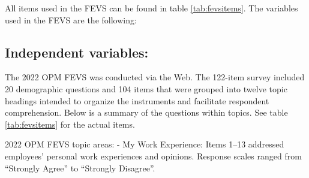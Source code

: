 \documentclass[
  man]{apa7}
\begin{document}
All items used in the FEVS can be found in table \ref{tab:fevsitems}. The variables used in the FEVS are the following:

\subsection{Independent variables:}\label{independent-variables}

The 2022 OPM FEVS was conducted via the Web. The 122-item survey included 20 demographic questions and 104 items that were grouped into twelve topic headings intended to organize the instruments and facilitate respondent comprehension. Below is a summary of the questions within topics. See table \ref{tab:fevsitems} for the actual items.

2022 OPM FEVS topic areas:
- My Work Experience: Items 1--13 addressed employees' personal work experiences and opinions. Response scales ranged from ``Strongly Agree'' to ``Strongly Disagree''.
\end{document}
